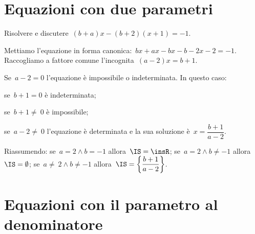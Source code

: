 \ovalbox{\risolvii \ref{ese:19.1}, \ref{ese:19.2}, \ref{ese:19.3}, \ref{ese:19.4}, \ref{ese:19.5}, \ref{ese:19.6}, \ref{ese:19.7}}

\section{Equazioni con due parametri}

\begin{exrig}
 \begin{esempio}
Risolvere e discutere~$(b+a)x-(b+2)(x+1)=-1$.

Mettiamo l'equazione in forma canonica:~$bx+ax-bx-b-2x-2=-1$.
Raccogliamo a fattore comune l'incognita~$(a-2)x=b+1$.
\begin{itemize*}
 \item Se~$a-2=0$ l'equazione è impossibile o indeterminata. In questo caso:
  \begin{itemize*}
   \item se~$b+1=0$ è indeterminata;
   \item se~$b+1\neq~0$ è impossibile;
  \end{itemize*}
 \item se~$a-2\neq~0$ l'equazione è determinata e la sua soluzione è~$x=\dfrac{b+1}{a-2}$.
\end{itemize*}
 \end{esempio}
Riassumendo:
se~$a=2\wedge b=-1$ allora~$\IS=\insR$; se~$a=2\wedge b\neq -1$ allora~$\IS=\emptyset$; se~$a\neq~2\wedge b\neq -1$ allora~$\IS=\left\{\dfrac{b+1}{a-2}\right\}$.
\end{exrig}

\ovalbox{\risolvii \ref{ese:19.8}, \ref{ese:19.9}, \ref{ese:19.10}}

\section{Equazioni con il parametro al denominatore}

